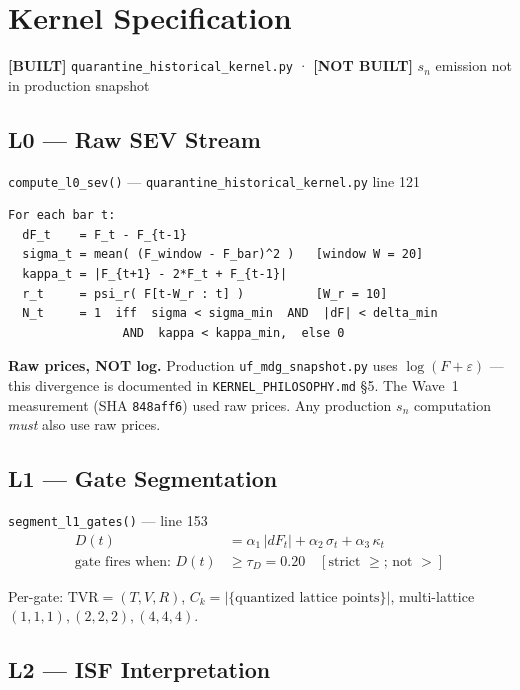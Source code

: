 \documentclass[11pt,a4paper]{article}
\newcommand{\statusbuilt}{\textcolor{statusbuilt}{\textbf{[BUILT]}}}
\newcommand{\statusnotbuilt}{\textcolor{statusnotbuilt}{\textbf{[NOT BUILT]}}}
\newcommand{\code}[1]{\texttt{\small#1}}
\newcommand{\sha}[1]{\texttt{\footnotesize#1}}
\begin{document}
\section{Kernel Specification}

\statusbuilt{} \texttt{quarantine\_historical\_kernel.py} · \statusnotbuilt{} $s_n$ emission not in production snapshot

\subsection{L0 — Raw SEV Stream}

\code{compute\_l0\_sev()} — \texttt{quarantine\_historical\_kernel.py} line 121

\begin{lstlisting}
For each bar t:
  dF_t    = F_t - F_{t-1}
  sigma_t = mean( (F_window - F_bar)^2 )   [window W = 20]
  kappa_t = |F_{t+1} - 2*F_t + F_{t-1}|
  r_t     = psi_r( F[t-W_r : t] )          [W_r = 10]
  N_t     = 1  iff  sigma < sigma_min  AND  |dF| < delta_min
                AND  kappa < kappa_min,  else 0
\end{lstlisting}

\textbf{Raw prices, NOT log.} Production \texttt{uf\_mdg\_snapshot.py} uses $\log(F+\varepsilon)$ — this divergence is documented in \texttt{KERNEL\_PHILOSOPHY.md} §5. The Wave~1 measurement (SHA \sha{848aff6}) used raw prices. Any production $s_n$ computation \emph{must} also use raw prices.

\subsection{L1 — Gate Segmentation}

\code{segment\_l1\_gates()} — line 153
\begin{align}
  D(t) &= \alpha_1\,|dF_t| + \alpha_2\,\sigma_t + \alpha_3\,\kappa_t\\
  \text{gate fires when: } D(t) &\geq \tau_D = 0.20 \quad [\text{strict }\geq\text{; not }>]
\end{align}

Per-gate: $\text{TVR} = (T, V, R)$,\; $C_k = |\{\text{quantized lattice points}\}|$,\; multi-lattice $(1,1,1), (2,2,2), (4,4,4)$.

\subsection{L2 — ISF Interpretation}
\end{document}
